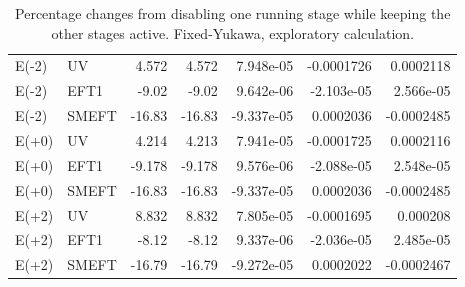 \begin{table}[htbp]
\begin{tabular}{llrrrrr}
E(-2) & UV & 4.572 & 4.572 & 7.948e-05 & -0.0001726 & 0.0002118 \\
E(-2) & EFT1 & -9.02 & -9.02 & 9.642e-06 & -2.103e-05 & 2.566e-05 \\
E(-2) & SMEFT & -16.83 & -16.83 & -9.337e-05 & 0.0002036 & -0.0002485 \\
E(+0) & UV & 4.214 & 4.213 & 7.941e-05 & -0.0001725 & 0.0002116 \\
E(+0) & EFT1 & -9.178 & -9.178 & 9.576e-06 & -2.088e-05 & 2.548e-05 \\
E(+0) & SMEFT & -16.83 & -16.83 & -9.337e-05 & 0.0002036 & -0.0002485 \\
E(+2) & UV & 8.832 & 8.832 & 7.805e-05 & -0.0001695 & 0.000208 \\
E(+2) & EFT1 & -8.12 & -8.12 & 9.337e-06 & -2.036e-05 & 2.485e-05 \\
E(+2) & SMEFT & -16.79 & -16.79 & -9.272e-05 & 0.0002022 & -0.0002467 \\
\hline
\end{tabular}
\caption{Percentage changes from disabling one running stage while keeping the other stages active. Fixed-Yukawa, exploratory calculation.}
\label{tab:generalised_running_a-4}
\end{table}
